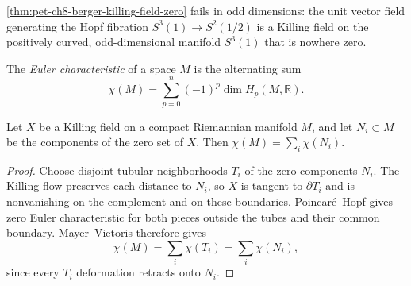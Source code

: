 \begin{remark}
  \label{rem:pet-ch8-berger-odd-dimension-counterexample}

  \cref{thm:pet-ch8-berger-killing-field-zero} fails in odd dimensions: the
  unit vector field generating the Hopf fibration $S^3(1)\to S^2(1/2)$ is a
  Killing field on the positively curved, odd-dimensional manifold $S^3(1)$
  that is nowhere zero.
\end{remark}

\begin{definition}
  \label{def:pet-ch8-euler-characteristic}

  The \emph{Euler characteristic} of a space $M$ is the alternating sum
  \[
    \chi(M)=\sum_{p=0}^n(-1)^p\dim H_p(M,\mathbb{R}).
  \]
\end{definition}

\begin{theorem}
  \label{thm:pet-ch8-euler-characteristic-zero-set-sum}

  Let $X$ be a Killing field on a compact Riemannian manifold $M$, and let
  $N_i\subset M$ be the components of the zero set of $X$. Then
  $\chi(M)=\sum_i\chi(N_i)$.
\end{theorem}
\begin{proof}
  \sketch
  Choose disjoint tubular neighborhoods \(T_i\) of the zero components \(N_i\).
  The Killing flow preserves each distance to \(N_i\), so \(X\) is tangent to
  \(\partial T_i\) and is nonvanishing on the complement and on these
  boundaries. Poincar\'e--Hopf gives zero Euler characteristic for both pieces
  outside the tubes and their common boundary. Mayer--Vietoris therefore gives
  \[
    \chi(M)=\sum_i\chi(T_i)=\sum_i\chi(N_i),
  \]
  since every \(T_i\) deformation retracts onto \(N_i\).
\end{proof}


